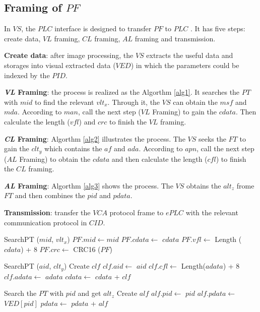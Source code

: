 \documentclass[journal,UTF8]{IEEEtran}
\begin{document}
\subsection{Framing of $PF$}
In $VS$, the $PLC$ interface is designed to transfer $PF$ to $PLC$ . It has five steps: create data, $VL$ framing, $CL$ framing, $AL$ framing and transmission.

\textbf{Create data}: after image processing, the $VS$ extracts the useful data and storages into visual extracted data ($VED$) in which the parameters could be indexed by the $PID$.

\textbf{\emph{VL} Framing}: the process is realized as the Algorthm \ref{alg1}. It searches the $PT$ with $mid$ to find the relevant $vlt_x$. Through it, the $VS$ can obtain the $msf$ and $mda$. According to $man$, call the next step ($VL$ Framing) to gain the $cdata$. Then calculate the length ($vfl$) and $crc$ to finish the $VL$ framing.

\textbf{\emph{CL} Framing}: Algorthm \ref{alg2} illustrates the process. The $VS$ seeks the $FT$ to gain the $clt_y$ which contains the $af$ and $ada$. According to $apn$, call the next step ($AL$ Framing) to obtain the $cdata$ and then calculate the length ($cfl$) to finish the $CL$ framing.  

\textbf{\emph{AL} Framing}: Algorthm \ref{alg3} shows the process. The $VS$ obtains the $alt_z$ frome $FT$ and then combines the $pid$ and $pdata$.

\textbf{Transmission}: transfer the $VCA$ protocol frame to $ePLC$ with the relevant communication protocol in $CID$.

\begin{algorithm}
	\label{alg1}
	\caption{$VLFraming$}%
	SearchPT ($mid$, $vlt_x$)\;
	$PF.mid\leftarrow mid$\; 
    $PF.cdata\leftarrow$ $cdata$\; 
	$PF.vfl\leftarrow$ Length ($cdata$) + 8\;
	$PF.crc\leftarrow$ CRC16 ($PF$)\;		 
\end{algorithm}

\begin{algorithm}
	\label{alg2}
	\caption{$CLFraming$}%
	SearchPT ($aid$, $clt_y$)\;
	Create $clf$\;
	$clf.aid\leftarrow$ $aid$\;
	$clf.cfl \leftarrow$ Length($adata$) + 8\;
	$clf.adata \leftarrow$ $adata$\;	
	$cdata\leftarrow$ $cdata$ + $clf$\;	 
\end{algorithm}
\begin{algorithm}
	\label{alg3}
	\caption{$ALFraming$}%
	Search the $PT$ with $pid$ and get $alt_z$\;
	Create $alf$\;
	$alf.pid\leftarrow$ $pid$\; %
	$alf.pdata \leftarrow$ $VED[pid]$\;
	$pdata\leftarrow$ $pdata$ + $alf$\;	 
\end{algorithm}
\end{document}
